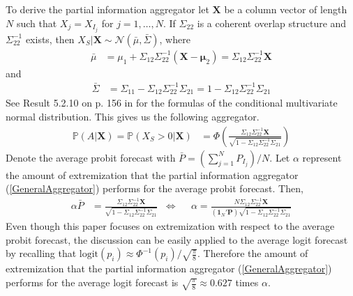 \documentclass[11pt,twoside]{article}
\renewcommand{\P}{\mathbb{P}}
\theoremstyle{definition}
\theoremstyle{definition}
\begin{document}
To derive the partial information aggregator let $\boldsymbol{X}$ be a column vector of length $N$ such that $X_j = X_{I_j}$ for $j = 1, \dots, N$. If $\Sigma_{22}$ is a coherent overlap structure and $\Sigma_{22}^{-1}$ exists, then $X_{S} | \boldsymbol{X} \sim \mathcal{N}(\bar{\mu}, \bar{\Sigma})$, where
\begin{align}
\bar{\mu} &= \mu_1 + \Sigma_{12} \Sigma_{22}^{-1} (\boldsymbol{X} - \boldsymbol{\mu}_2) =  \Sigma_{12} \Sigma_{22}^{-1} \boldsymbol{X} \label{condMu}
\end{align}
and
\begin{align}
 \bar{\Sigma}&= \Sigma_{11} - \Sigma_{12} \Sigma_{22}^{-1} \Sigma_{21} =1 - \Sigma_{12} \Sigma_{22}^{-1} \Sigma_{21}  \label{condSigma}
\end{align}
See  Result 5.2.10 on p. 156 in \cite{ravishanker2001first} for the formulas of the conditional multivariate normal distribution. This gives us the following aggregator. 
\begin{align}
\P\left(A  | \boldsymbol{X}\right)  = \P\left(X_{S} > 0 | \boldsymbol{X}\right) &= \Phi\left( \frac{\Sigma_{12} \Sigma_{22}^{-1} \boldsymbol{X}}{\sqrt{1 - \Sigma_{12} \Sigma_{22}^{-1} \Sigma_{21}}}\right) \label{GeneralAggregator}
\end{align}
Denote the average probit forecast with $\bar{P} = \left( \sum_{j=1}^N P_{I_j} \right)/N$. Let $\alpha$ represent the amount of extremization that the partial information aggregator (\ref{GeneralAggregator}) performs for the average probit forecast. Then,
\begin{align}
\alpha \bar{P}&=  \frac{\Sigma_{12} \Sigma_{22}^{-1} \boldsymbol{X}}{\sqrt{1 - \Sigma_{12} \Sigma_{22}^{-1} \Sigma_{21}}}  &\Leftrightarrow&& \alpha  = \frac{N \Sigma_{12} \Sigma_{22}^{-1} \boldsymbol{X}}{\left(\boldsymbol{1}_N' \boldsymbol{P} \right) \sqrt{1 - \Sigma_{12} \Sigma_{22}^{-1} \Sigma_{21}}} \label{alpha}
\end{align}
Even though this paper focuses on extremization with respect to the average probit forecast, the discussion can be easily applied to the average logit forecast by recalling that $\text{logit}(p_i) \approx \Phi^{-1}(p_i)/\sqrt{\frac{\pi}{8}}$. Therefore the amount of extremization that the partial information aggregator (\ref{GeneralAggregator}) performs for the average logit forecast is $\sqrt{\frac{\pi}{8}} \approx 0.627$ times $\alpha$.  
\end{document}
